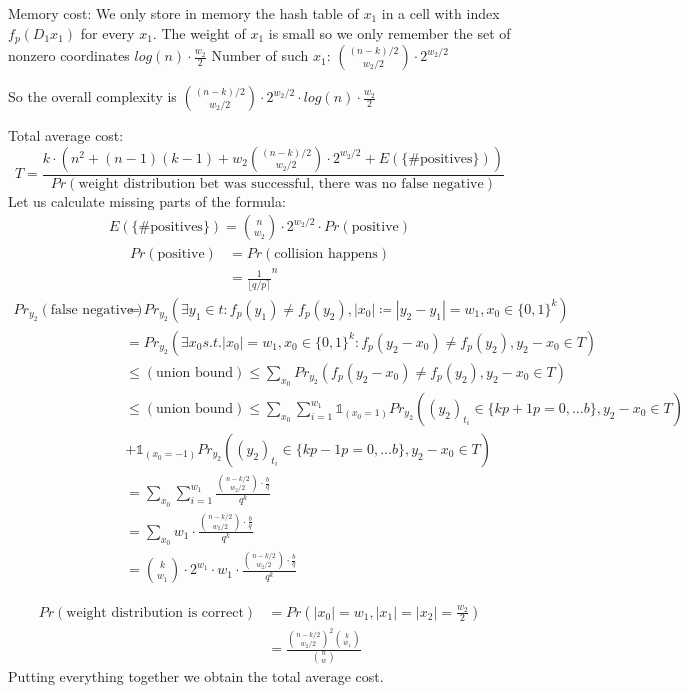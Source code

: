 \documentclass[12pt]{article}
\begin{document}
Memory cost:
We only store in memory the hash table of $x_1$ in a cell with index $f_{p}(D_1x_1)$ for every $x_1$.
The weight of $x_1$ is small so we only remember the set of nonzero coordinates $log(n) \cdot \frac{w_2}{2}$ Number of such $x_1$: $\binom{(n-k)/2}{w_2/2} \cdot 2^{w_2/2}$

So the overall complexity is  $\binom{(n-k)/2}{w_2/2} \cdot 2^{w_2/2} \cdot log(n) \cdot \frac{w_2}{2}$

Total average cost:
\[
    T = \frac{k \cdot (n^2 + (n-1)(k-1) + w_2\binom{(n-k)/2}{w_2/2} \cdot 2^{w_2/2} + E(\{\text{\# positives}\}))}{Pr(\text{weight distribution bet was successful, there was no false negative})}
\]
Let us calculate missing parts of the formula:
\[
\begin{split}
    E(\{\text{\# positives}\}) = \binom{n}{w_2} \cdot 2^{w_2/2} \cdot Pr(\text{positive})
\end{split}
\]
\[
\begin{split}
    Pr(\text{positive}) & = Pr(\text{collision happens}) \\
    & = \frac{1}{\lfloor q/p \rceil}^{n}
\end{split}
\]
\[
\begin{split}
    Pr_{y_2}(\text{false negative}) & = Pr_{y_2}(\exists y_1 \in t: f_p(y_1) \neq f_p(y_2), |x_0| \coloneqq |y_2 - y_1| = w_1, x_0 \in \{0,1\}^{k}) \\
    & = Pr_{y_2}(\exists x_0 s.t. |x_0| = w_1, x_0 \in\{0,1\}^{k}: f_p(y_2 - x_0) \neq f_p(y_2), y_2 - x_0 \in T) \\
    & \leq (\text{union bound}) \leq \sum_{x_0} Pr_{y_2}(f_p(y_2 - x_0) \neq f_p(y_2), y_2 - x_0 \in T) \\
    & \leq (\text{union bound}) \leq \sum_{x_0} \sum_{i = 1}^{w_1} \mathds{1}_{(x_0 = 1)}Pr_{y_2}((y_2)_{t_i} \in \{kp+1 p=0, \dots b\}, y_2 - x_0 \in T) \\
    & + \mathds{1}_{(x_0 = -1)}Pr_{y_2}((y_2)_{t_i} \in \{kp-1 p=0, \dots b\}, y_2 - x_0 \in T) \\
    & = \sum_{x_0} \sum_{i = 1}^{w_1} \frac{\binom{n-k/2}{w_2/2} \cdot \frac{b}{q}}{q^k} \\
    & = \sum_{x_0} w_1 \cdot \frac{\binom{n-k/2}{w_2/2} \cdot \frac{b}{q}}{q^k} \\
    & = \binom{k}{w_1} \cdot 2^{w_1} \cdot w_1 \cdot \frac{\binom{n-k/2}{w_2/2} \cdot \frac{b}{q}}{q^k}
\end{split}
\]

\[
\begin{split}
    Pr(\text{weight distribution is correct}) & = Pr(|x_0| = w_1, |x_1| = |x_2| = \frac{w_2}{2}) \\
    & = \frac{\binom{n-k/2}{w_2/2}^{2}\binom{k}{w_1}}{\binom{n}{w}}
\end{split}
\]
Putting everything together we obtain the total average cost.



\end{document}
